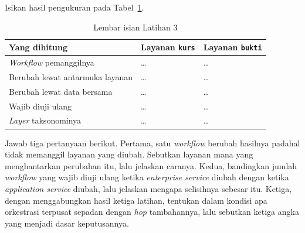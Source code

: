 Isikan hasil pengukuran pada Tabel~\ref{tab:lat3odsoa-hasil}.

\begin{table}[htbp]
  \centering
  \caption{Lembar isian Latihan 3}
  \label{tab:lat3odsoa-hasil}
  \begin{tabularx}{\textwidth}{|X|l|l|}
    \hline
    \textbf{Yang dihitung} & \textbf{Layanan \texttt{kurs}} & \textbf{Layanan \texttt{bukti}} \\
    \hline
    \textit{Workflow} pemanggilnya & \dots & \dots \\
    \hline
    Berubah lewat antarmuka layanan & \dots & \dots \\
    \hline
    Berubah lewat data bersama & \dots & \dots \\
    \hline
    Wajib diuji ulang & \dots & \dots \\
    \hline
    \textit{Layer} taksonominya & \dots & \dots \\
    \hline
  \end{tabularx}
\end{table}

Jawab tiga pertanyaan berikut. Pertama, satu \textit{workflow} berubah hasilnya
padahal tidak memanggil layanan yang diubah. Sebutkan layanan mana yang
menghantarkan perubahan itu, lalu jelaskan caranya. Kedua, bandingkan jumlah
\textit{workflow} yang wajib diuji ulang ketika \textit{enterprise service} diubah
dengan ketika \textit{application service} diubah, lalu jelaskan mengapa
selisihnya sebesar itu. Ketiga, dengan menggabungkan hasil ketiga latihan,
tentukan dalam kondisi apa orkestrasi terpusat sepadan dengan \textit{hop}
tambahannya, lalu sebutkan ketiga angka yang menjadi dasar keputusannya.
